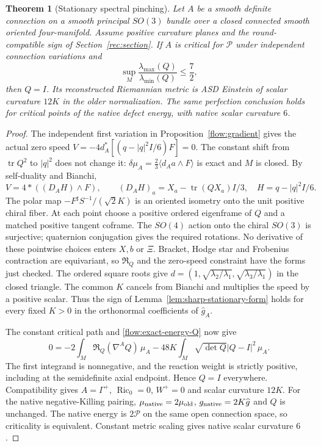 \documentclass[11pt]{article}
\numberwithin{equation}{section}
\newtheorem{theorem}{Theorem}[section]
\theoremstyle{definition}
\theoremstyle{remark}
\DeclareMathOperator{\Ric}{Ric}
\begin{document}
\begin{theorem}[Stationary spectral pinching]
\label{thm:stationary-spectral-pinching}
Let $A$ be a smooth definite connection on a smooth principal
$SO(3)$ bundle over a closed connected smooth oriented
four-manifold. Assume positive curvature planes and the
round-compatible sign of Section~\ref{rec:section}.
If $A$ is critical for $\mathcal P$ under independent
connection variations and
\[
 \sup_M\frac{\lambda_{\max}(Q)}{\lambda_{\min}(Q)}\le\frac72,
\]
then $Q=I$. Its reconstructed Riemannian metric is ASD
Einstein of scalar curvature $12K$ in the older normalization.
The same perfection conclusion holds for critical points of
the native defect energy, with native scalar curvature $6$.
\end{theorem}
\begin{proof}
The independent first variation in
Proposition~\ref{flow:gradient} gives the actual zero speed
$V=-4d_A^*[(q-|q|^2I/6)F]=0$. The constant shift from
$\operatorname{tr}Q^2$ to $|q|^2$ does not change it:
$\delta\mu_A=\tfrac23\langle d_Aa\wedge F\rangle$ is exact
and $M$ is closed. By self-duality and Bianchi,
\[
 V=4*((D_AH)\wedge F),\qquad
 (D_AH)_a=X_a-\operatorname{tr}(QX_a)I/3,
 \quad H=q-|q|^2I/6.
\]
The polar map $-F^\sharp S^{-1}/(\sqrt2K)$ is an oriented
isometry onto the unit positive chiral fiber. At each point
choose a positive ordered eigenframe of $Q$ and a matched
positive tangent coframe. The $SO(4)$ action onto the chiral
$SO(3)$ is surjective; quaternion conjugation gives the
required rotations. No derivative of these pointwise
choices enters $X,b$ or $\Xi$. Bracket, Hodge star and
Frobenius contraction are equivariant, so $\mathfrak R_Q$
and the zero-speed constraint have the forms just checked.
The ordered square roots give
$d=(1,\sqrt{\lambda_2/\lambda_1},\sqrt{\lambda_3/\lambda_1})$
in the closed triangle. The common $K$ cancels from Bianchi
and multiplies the speed by a positive scalar. Thus the sign
of Lemma~\ref{lem:sharp-stationary-form} holds for every
fixed $K>0$ in the orthonormal coefficients of
$\widehat g_A$.

The constant critical path and
\eqref{flow:exact-energy-Q} now give
\[
 0=-2\int_M\mathfrak R_Q(\nabla^AQ)\,\mu_A
       -48K\int_M\sqrt{\det Q}|Q-I|^2\,\mu_A.
\]
The first integrand is nonnegative, and the reaction weight
is strictly positive, including at the semidefinite axial endpoint.
Hence $Q=I$ everywhere.
Compatibility gives $A=\Gamma^+$, $\Ric_0=0$, $W^+=0$
and scalar curvature $12K$.
For the native negative-Killing pairing,
$\mu_{\rm native}=2\mu_{\rm old}$,
$g_{\rm native}=2K\widehat g$ and $Q$ is unchanged.
The native energy is $2\mathcal P$ on the same open
connection space, so criticality is equivalent. Constant
metric scaling gives native scalar curvature $6$.
\end{proof}
\end{document}
